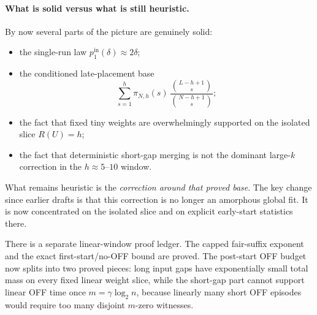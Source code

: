 \paragraph{What is solid versus what is still heuristic.}
By now several parts of the picture are genuinely solid:
\begin{itemize}
\item the single-run law \(p_1^{\mathrm{in}}(\delta)\approx 2\delta\);
\item the conditioned late-placement base
\[
\sum_{s=1}^{h}
\pi_{N,h}(s)\,
\frac{\binom{L-h+1}{s}}{\binom{N-h+1}{s}};
\]
\item the fact that fixed tiny weights are overwhelmingly supported on the isolated slice \(R(U)=h\);
\item the fact that deterministic short-gap merging is not the dominant large-\(k\) correction in the
\(h\approx 5\text{--}10\) window.
\end{itemize}
What remains heuristic is the \emph{correction around that proved base}. The key change since earlier drafts is that
this correction is no longer an amorphous global fit. It is now concentrated on the isolated slice and on explicit
early-start statistics there.

There is a separate linear-window proof ledger. The capped fair-suffix exponent and the exact first-start/no-OFF
bound are proved. The post-start OFF budget now splits into two proved pieces: long input gaps have exponentially
small total mass on every fixed linear weight slice, while the short-gap part cannot support linear OFF time once
\(m=\gamma\log_2 n\), because linearly many short OFF episodes would require too many disjoint \(m\)-zero witnesses.

